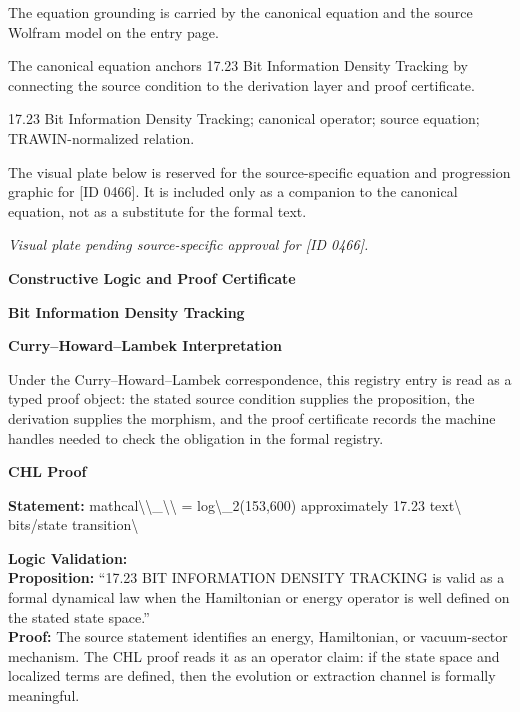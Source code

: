 The equation grounding is carried by the canonical equation and the source Wolfram model on the entry page.

The canonical equation anchors 17.23 Bit Information Density Tracking by connecting the source condition to the derivation layer and proof certificate.

17.23 Bit Information Density Tracking; canonical operator; source equation; TRAWIN-normalized relation.
\endgroup

\begingroup\footnotesize\sloppy
The visual plate below is reserved for the source-specific equation and progression graphic for [ID 0466]. It is included only as a companion to the canonical equation, not as a substitute for the formal text.
\par\endgroup
\begingroup\footnotesize\itshape
Visual plate pending source-specific approval for [ID 0466].
\par\endgroup

\clearpage
\begingroup\tzpsupportsetup
\noindent\textbf{\fontsize{10.8pt}{12.8pt}\selectfont [ID 0466] Constructive Logic and Proof Certificate}\par
\noindent\textbf{\fontsize{10pt}{12pt} Bit Information Density Tracking}\par
\vspace{0.45em}
\begingroup
\footnotesize
\setlength{\parskip}{0.22em}
\setlength{\parindent}{0pt}
\noindent\textbf{Curry--Howard--Lambek Interpretation}\par
Under the Curry--Howard--Lambek correspondence, this registry entry is read as a typed proof
object: the stated source condition supplies the proposition, the derivation supplies the
morphism, and the proof certificate records the machine handles needed to check the obligation
in the formal registry.

\vspace{0.45em}
\noindent\textbf{CHL Proof}\par
\textbf{Statement:} mathcal\textbackslash{}\textbackslash{}\_\textbackslash{}\textbackslash{} = log\textbackslash{}\_2(153,600) approximately 17.23 text\textbackslash{} bits/state transition\textbackslash{}

\textbf{Logic Validation:}\\
\textbf{Proposition:} ``17.23 BIT INFORMATION DENSITY TRACKING is valid as a formal dynamical law when the
Hamiltonian or energy operator is well defined on the stated state space.''\\
\textbf{Proof:} The source statement identifies an energy, Hamiltonian, or vacuum-sector mechanism. The
CHL proof reads it as an operator claim: if the state space and localized terms are
defined, then the evolution or extraction channel is formally meaningful.

